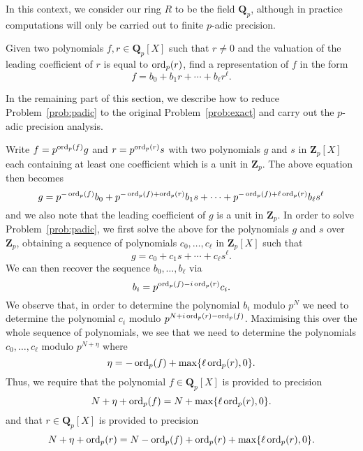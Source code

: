 In this context, we consider our ring $R$ to be the field $\mathbf{Q}_p$, 
although in practice computations will only be carried out to finite 
$p$-adic precision.

\begin{prob} \label{prob:padic}
Given two polynomials $f, r \in \mathbf{Q}_p[X]$ such that 
$r \neq 0$ and the valuation of the leading coefficient of 
$r$ is equal to $\operatorname{ord}_p(r)$, find a representation of $f$ 
in the form
\begin{equation*}
f = b_0 + b_1 r + \dotsb + b_{\ell} r^{\ell}.
\end{equation*}
\end{prob}

In the remaining part of this section, we describe how to 
reduce Problem~\ref{prob:padic} to the original 
Problem~\ref{prob:exact} and carry out the $p$-adic precision 
analysis.

Write $f = p^{\operatorname{ord}_p(f)} g$ and $r = p^{\operatorname{ord}_p(r)} s$ 
with two polynomials $g$ and $s$ in $\mathbf{Z}_p[X]$ 
each containing at least one coefficient which is a unit 
in $\mathbf{Z}_p$.  The above equation then becomes
\begin{equation*}
g = p^{-\operatorname{ord}_p(f)} b_0 + p^{-\operatorname{ord}_p(f) + \operatorname{ord}_p(r)} b_1 s + \dotsb + p^{-\operatorname{ord}_p(f) + \ell \operatorname{ord}_p(r)} b_{\ell} s^{\ell}
\end{equation*}
and we also note that the leading coefficient of $g$ 
is a unit in $\mathbf{Z}_p$.
In order to solve Problem~\ref{prob:padic}, we first solve the above 
for the polynomials $g$ and $s$ over $\mathbf{Z}_p$, obtaining a 
sequence of polynomials $c_0, \dotsc, c_{\ell}$ in $\mathbf{Z}_p[X]$ 
such that 
\begin{equation*}
g = c_0 + c_1 s + \dotsb + c_{\ell} s^{\ell}.
\end{equation*}
We can then recover the sequence $b_0, \dotsc, b_{\ell}$ via 
\begin{equation*}
b_i = p^{\operatorname{ord}_p(f) - i \operatorname{ord}_p(r)} c_i.
\end{equation*}
We observe that, in order to determine the polynomial $b_i$ 
modulo $p^N$ we need to determine the polynomial $c_i$ 
modulo $p^{N + i \operatorname{ord}_p(r) - \operatorname{ord}_p(f)}$.  Maximising this 
over the whole sequence of polynomials, we see that we need 
to determine the polynomials $c_0, \dotsc, c_{\ell}$ modulo 
$p^{N + \eta}$ where
\begin{equation*}
\eta = - \operatorname{ord}_p(f) + \max\{\ell \operatorname{ord}_p(r), 0\}.
\end{equation*}
Thus, we require that the polynomial $f \in \mathbf{Q}_p[X]$ 
is provided to precision 
\begin{equation*}
N + \eta + \operatorname{ord}_p(f) = N + \max\{\ell \operatorname{ord}_p(r), 0\}.
\end{equation*}
and that $r \in \mathbf{Q}_p[X]$ is provided to precision 
\begin{equation*}
N + \eta + \operatorname{ord}_p(r) = N - \operatorname{ord}_p(f) + \operatorname{ord}_p(r) + \max\{\ell \operatorname{ord}_p(r), 0\}.
\end{equation*}

